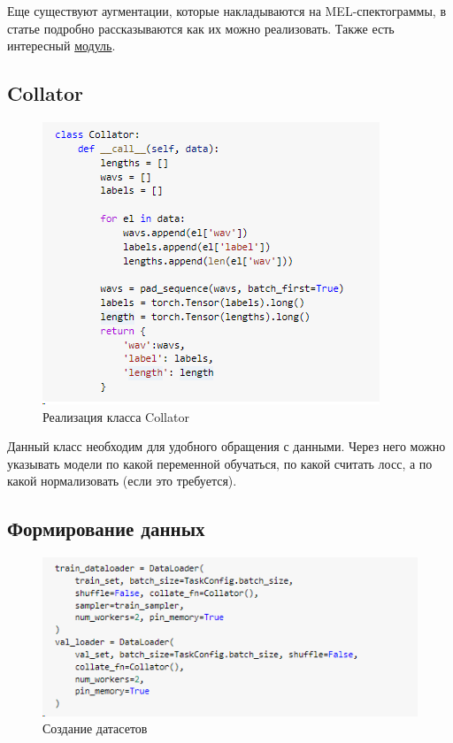 \documentclass[a4paper,12pt]{article}
\begin{document}
  	Еще существуют аугментации, которые накладываются на MEL-спектограммы, в статье \cite{1} подробно рассказываются как их можно реализовать. Также есть интересный \href{https://speechbrain.readthedocs.io/en/latest/API/speechbrain.processing.speech_augmentation.html#speechbrain.processing.speech_augmentation.AddBabble}{модуль}. 
 	 
 	\subsection{Collator}
 	
 	\begin{figure}[H]
 		\centering
 		\includegraphics[width=0.7\linewidth]{Image/Collator}
 		\caption{Реализация класса Collator}
 		\label{fig:collator}
 	\end{figure}
 	Данный класс необходим для удобного обращения с данными. Через него можно указывать модели по какой переменной обучаться, по какой считать лосс, а по какой нормализовать (если это требуется).
 	
 	
 	\subsection{Формирование данных}
 	\begin{figure}[H]
 		\centering
 		\includegraphics[width=0.7\linewidth]{Image/Dataloader}
 		\caption{Создание датасетов}
 		\label{fig:dataloader}
 	\end{figure}
 
\end{document}
